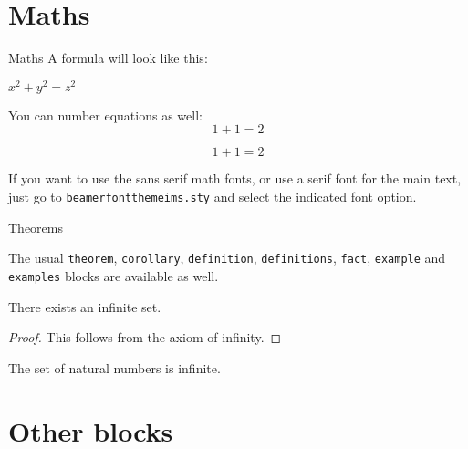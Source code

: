 \documentclass[usenames,dvipsnames,10pt,aspectratio=169]{beamer}
\begin{document}
\section{Maths}

\begin{frame}{Maths}
A formula will look like this: 
\begin{center}
 $x^2 + y^2 = z^2$
\end{center}

You can number equations as well:
\begin{equation}
1+1=2
\end{equation}

\begin{equation}
1+1=2 \tag{custom label!}
\end{equation}

\vskip 0.5cm

If you want to use the sans serif math fonts, or use a serif font for the main text, just go to \texttt{beamerfontthemeims.sty} and select the indicated font option. 

\end{frame}

\begin{frame}{Theorems}

The usual \texttt{theorem}, \texttt{corollary}, \texttt{definition}, \texttt{definitions}, \texttt{fact}, \texttt{example} and \texttt{examples} blocks are available as well.

\begin{theorem}
There exists an infinite set.
\end{theorem}
\begin{proof}
This follows from the axiom of infinity.
\end{proof}
\begin{example}
The set of natural numbers is infinite. 
\end{example}

\end{frame}

\section{Other blocks}
\end{document}
